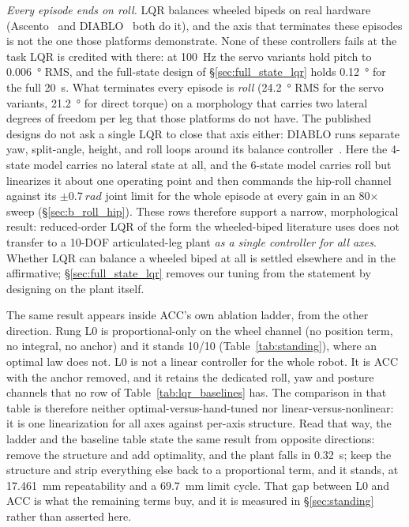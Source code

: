 \documentclass[conference]{IEEEtran}
\begin{document}
\emph{Every episode ends on roll.} LQR balances wheeled bipeds on real hardware (Ascento~\cite{klemm2019ascento} and DIABLO~\cite{diablo2024} both do it), and the axis that terminates these episodes is not the one those platforms demonstrate. None of these controllers fails at the task LQR is credited with there: at \SI{100}{Hz} the servo variants hold pitch to \SI{0.006}{\degree} RMS, and the full-state design of \S\ref{sec:full_state_lqr} holds \SI{0.12}{\degree} for the full \SI{20}{s}. What terminates every episode is \emph{roll} (\SI{24.2}{\degree} RMS for the servo variants, \SI{21.2}{\degree} for direct torque) on a morphology that carries two lateral degrees of freedom per leg that those platforms do not have. The published designs do not ask a single LQR to close that axis either: DIABLO runs separate yaw, split-angle, height, and roll loops around its balance controller~\cite{diablo2024}. Here the 4-state model carries no lateral state at all, and the 6-state model carries roll but linearizes it about one operating point and then commands the hip-roll channel against its $\pm\SI{0.7}{rad}$ joint limit for the whole episode at every gain in an \num{80}$\times$ sweep (\S\ref{sec:b_roll_hip}). These rows therefore support a narrow, morphological result: reduced-order LQR of the form the wheeled-biped literature uses does not transfer to a 10-DOF articulated-leg plant \emph{as a single controller for all axes}. Whether LQR can balance a wheeled biped at all is settled elsewhere and in the affirmative; \S\ref{sec:full_state_lqr} removes our tuning from the statement by designing on the plant itself.

The same result appears inside ACC's own ablation ladder, from the other direction. Rung L0 is proportional-only on the wheel channel (no position term, no integral, no anchor) and it stands \num{10}/\num{10} (Table~\ref{tab:standing}), where an optimal law does not. L0 is not a linear controller for the whole robot. It is ACC with the anchor removed, and it retains the dedicated roll, yaw and posture channels that no row of Table~\ref{tab:lqr_baselines} has. The comparison in that table is therefore neither optimal-versus-hand-tuned nor linear-versus-nonlinear: it is one linearization for all axes against per-axis structure. Read that way, the ladder and the baseline table state the same result from opposite directions: remove the structure and add optimality, and the plant falls in \SI{0.32}{s}; keep the structure and strip everything else back to a proportional term, and it stands, at \SI{17.461}{mm} repeatability and a \SI{69.7}{mm} limit cycle. That gap between L0 and ACC is what the remaining terms buy, and it is measured in \S\ref{sec:standing} rather than asserted here.
\end{document}
